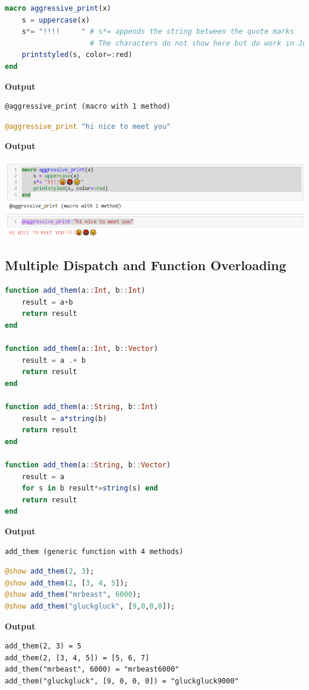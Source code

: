 \begin{lstlisting}[language=Julia,style=mystyle]
macro aggressive_print(x)
    s = uppercase(x)
    s*= "!!!!     " # s*= appends the string between the quote marks
                    # The characters do not show here but do work in Julia; see below.
    printstyled(s, color=:red)
end
\end{lstlisting}
\textbf{Output} 
\begin{verbatim}
@aggressive_print (macro with 1 method)
\end{verbatim}


\begin{lstlisting}[language=Julia,style=mystyle]
@aggressive_print "hi nice to meet you"
\end{lstlisting}
\textbf{Output} 



\includegraphics[width=1.0\columnwidth]{graphics/Chap06/AggressivePrint.png}%

\subsection{Multiple Dispatch and Function Overloading}


\begin{lstlisting}[language=Julia,style=mystyle]
function add_them(a::Int, b::Int)
    result = a+b
    return result
end

function add_them(a::Int, b::Vector)
    result = a .+ b
    return result
end

function add_them(a::String, b::Int)
    result = a*string(b)
    return result
end

function add_them(a::String, b::Vector) 
    result = a
    for s in b result*=string(s) end
    return result
end
\end{lstlisting}
\textbf{Output} 
\begin{verbatim}
add_them (generic function with 4 methods)
\end{verbatim}

\begin{lstlisting}[language=Julia,style=mystyle]
@show add_them(2, 3);
@show add_them(2, [3, 4, 5]);
@show add_them("mrbeast", 6000);
@show add_them("gluckgluck", [9,0,0,0]);
\end{lstlisting}
\textbf{Output} 
\begin{verbatim}
add_them(2, 3) = 5
add_them(2, [3, 4, 5]) = [5, 6, 7]
add_them("mrbeast", 6000) = "mrbeast6000"
add_them("gluckgluck", [9, 0, 0, 0]) = "gluckgluck9000"
\end{verbatim}



